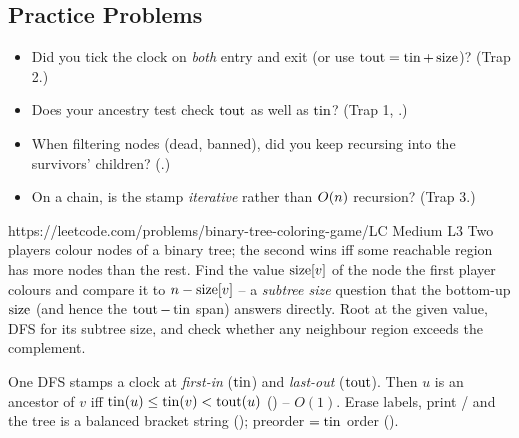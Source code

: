 \subsection{Practice Problems}

\begin{stuckbox}
\begin{itemize}[nosep, leftmargin=1.4em]
  \item Did you tick the clock on \emph{both} entry and exit (or use $\operatorname{tout}=\operatorname{tin}+\operatorname{size}$)?
        (Trap 2.)
  \item Does your ancestry test check $\operatorname{tout}$ as well as $\operatorname{tin}$? (Trap 1,
        .)
  \item When filtering nodes (dead, banned), did you keep recursing into the survivors'
        children? (.)
  \item On a chain, is the stamp \emph{iterative} rather than $O(n)$ recursion? (Trap 3.)
\end{itemize}
\end{stuckbox}

\begin{practiceset}
    {https://leetcode.com/problems/binary-tree-coloring-game/}{LC Medium L3}
    {Two players colour nodes of a binary tree; the second wins iff some reachable region
    has more nodes than the rest. Find the value $\operatorname{size}[v]$ of the node the first player
    colours and compare it to $n-\operatorname{size}[v]$ -- a \emph{subtree size} question that the
    bottom-up $\operatorname{size}$ (and hence the $\operatorname{tout}-\operatorname{tin}$ span) answers directly. Root at the given
    value, DFS for its subtree size, and check whether any neighbour region exceeds the
    complement.}
\end{practiceset}

\begin{recallbox}
One DFS stamps a clock at \emph{first-in} ($\operatorname{tin}$) and \emph{last-out} ($\operatorname{tout}$). Then $u$
is an ancestor of $v$ iff $\operatorname{tin}(u) \le \operatorname{tin}(v) < \operatorname{tout}(u)$ () -- $O(1)$.
Erase labels, print \code{(}/\code{)} and the tree is a balanced bracket string
(); preorder $=\operatorname{tin}$ order ().
\end{recallbox}
